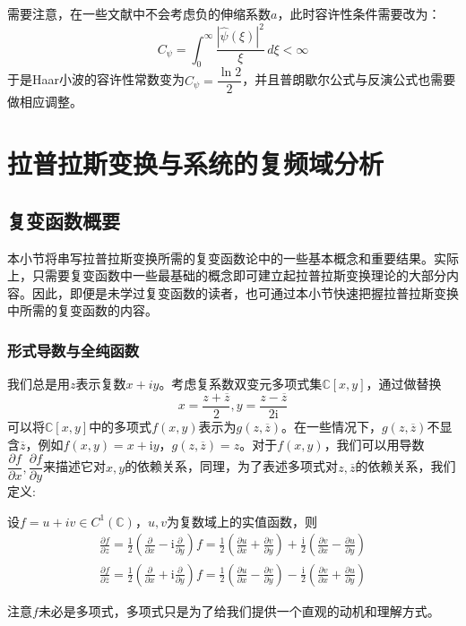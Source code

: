 \documentclass{ctexbook}
\begin{document}
需要注意，在一些文献中不会考虑负的伸缩系数$a$，此时容许性条件需要改为：
\[C_{\psi}=\int_{0}^{\infty}\frac{|\hat{\psi}(\xi)|^2}{\xi}\,d\xi<\infty\]
于是Haar小波的容许性常数变为$C_{\psi}=\dfrac{\ln 2}{2}$，并且普朗歇尔公式与反演公式也需要做相应调整。

\chapter{拉普拉斯变换与系统的复频域分析}

\section{复变函数概要}\label{sec:Complex}

本小节将串写拉普拉斯变换所需的复变函数论中的一些基本概念和重要结果\cite{Function_Theory}。实际上，只需要复变函数中一些最基础的概念即可建立起拉普拉斯变换理论的大部分内容。因此，即便是未学过复变函数的读者，也可通过本小节快速把握拉普拉斯变换中所需的复变函数的内容。

\subsection{形式导数与全纯函数}\label{sub:derivative_and_holomorphic}
我们总是用$z$表示复数$x+iy$。考虑复系数双变元多项式集$\mathbb{C}[x,y]$，通过做替换$$x=\frac{z+\overline{z}}{2},y=\frac{z-\overline{z}}{2\mathrm{i}}$$
可以将$\mathbb{C}[x,y]$中的多项式$f(x,y)$表示为$g(z,\overline{z})$。在一些情况下，$g(z,\overline{z})$不显含$\overline{z}$，例如$f(x,y)=x+\mathrm{i}y$，$g(z,\overline{z})=z$。对于$f(x,y)$，我们可以用导数$\dfrac{\partial f}{\partial x},\dfrac{\partial f}{\partial y}$来描述它对$x,y$的依赖关系，同理，为了表述多项式对$z,\overline{z}$的依赖关系，我们定义:\begin{definition}[形式导数]
    设$f=u+iv\in C^1(\mathbb{C})$，$u,v$为复数域上的实值函数，则
    \begin{align*}
        \frac{\partial f}{\partial z}=\frac{1}{2}\left(\frac{\partial}{\partial x}-\mathrm{i}\frac{\partial}{\partial y}\right)f=\frac{1}{2}\left(\frac{\partial u}{\partial x}+\frac{\partial v}{\partial y}\right)+\frac{\mathrm{i}}{2}\left(\frac{\partial v}{\partial x}-\frac{\partial u}{\partial y}\right)\\
        \frac{\partial f}{\partial \overline{z}}=\frac{1}{2}\left(\frac{\partial}{\partial x}+\mathrm{i}\frac{\partial}{\partial y}\right)f=\frac{1}{2}\left(\frac{\partial u}{\partial x}-\frac{\partial v}{\partial y}\right)-\frac{\mathrm{i}}{2}\left(\frac{\partial v}{\partial x}+\frac{\partial u}{\partial y}\right)
    \end{align*}
\end{definition}
注意$f$未必是多项式，多项式只是为了给我们提供一个直观的动机和理解方式。
\end{document}

